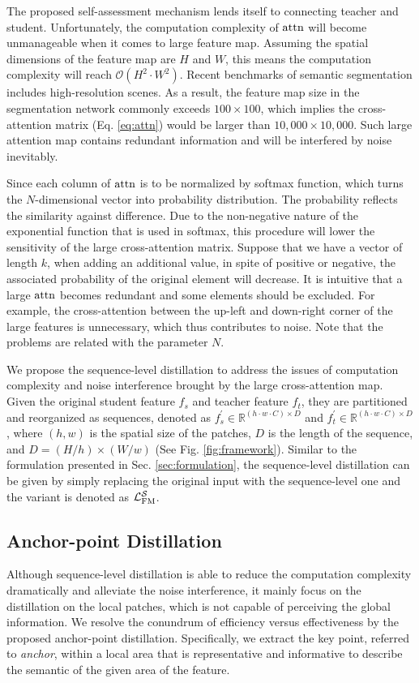 \documentclass[10pt,twocolumn,letterpaper]{article}
\begin{document}
The proposed self-assessment mechanism lends itself to connecting teacher and student. Unfortunately, the computation complexity of $\rm{attn}$ will become unmanageable when it comes to large feature map. Assuming the spatial dimensions of the feature map are $H$ and $W$, this means the computation complexity will reach $\mathcal{O}(H^2\cdot W^2)$. Recent benchmarks of semantic segmentation includes high-resolution scenes. As a result, the feature map size in the segmentation network commonly exceeds $100 \times 100$, which implies the cross-attention matrix (Eq. \ref{eq:attn}) would be larger than $10,000 \times 10,000$. Such large attention map contains redundant information and will be interfered by noise inevitably. 

Since each column of $\rm{attn}$ is to be normalized by softmax function, which turns the $N$-dimensional vector into probability distribution. The probability reflects the similarity against difference. Due to the non-negative nature of the exponential function that is used in softmax, this procedure will lower the sensitivity of the large cross-attention matrix. Suppose that we have a vector of length $k$, when adding an additional value, in spite of positive or negative, the associated probability of the original element will decrease. It is intuitive that a large $\rm{attn}$ becomes redundant and some elements should be excluded. For example, the cross-attention between the up-left and down-right corner of the large features is unnecessary, which thus contributes to noise. Note that the problems are related with the parameter $N$. 

We propose the sequence-level distillation to address the issues of computation complexity and noise interference brought by the large cross-attention map. Given the original student feature $f_s$ and teacher feature $f_t$, they are partitioned and reorganized as sequences, denoted as $f_s^{'}\in\mathbb{R}^{(h \cdot w \cdot C) \times D}$ and $f_t^{'}\in\mathbb{R}^{(h \cdot w \cdot C)\times D}$, where $(h,w)$ is the spatial size of the patches, $D$ is the length of the sequence, and $D=(H/h)\times(W/w)$ (See Fig. \ref{fig:framework}). Similar to the formulation presented in Sec. \ref{sec:formulation}, the sequence-level distillation can be given by simply replacing the original input with the sequence-level one and the variant is denoted as $\mathcal{L}_{\rm{FM}}^\mathcal{S}$.

\subsection{Anchor-point Distillation}
\label{sec:anchor}
Although sequence-level distillation is able to reduce the computation complexity dramatically and alleviate the noise interference, it mainly focus on the distillation on the local patches, which is not capable of perceiving the global information. We resolve the conundrum of efficiency versus effectiveness by the proposed anchor-point distillation. Specifically, we extract the key point, referred to \textit{anchor}, within a local area that is representative and informative to describe the semantic of the given area of the feature.  
\end{document}
